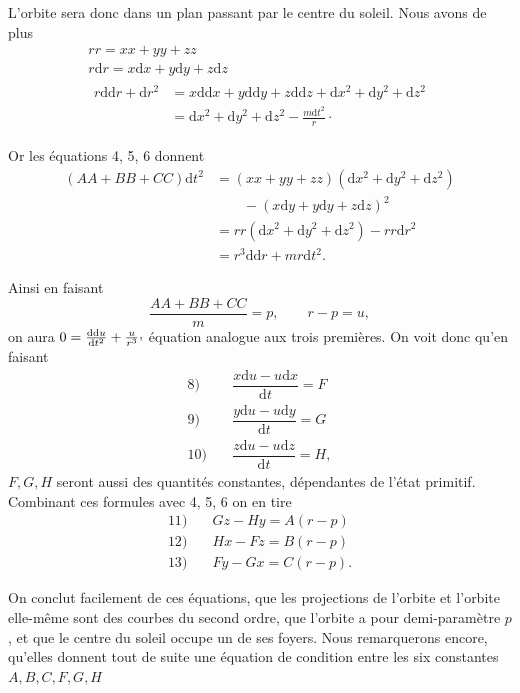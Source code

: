 \par L’orbite sera donc dans un plan passant par le centre du soleil. Nous avons de plus
\[
\begin{gathered}
rr=xx+yy+zz\\
r\mathrm{d}r=x\mathrm{d}x+y\mathrm{d}y+z\mathrm{d}z\\
\begin{aligned}
r\mathrm{dd}r+\mathrm{d}r^2&=x\mathrm{dd}x+y\mathrm{dd}y+z\mathrm{dd}z+\mathrm{d}x^2+\mathrm{d}y^2+\mathrm{d}z^2\\
&=\mathrm{d}x^2+\mathrm{d}y^2+\mathrm{d}z^2-\frac{m\mathrm{d}t^2}{r}\mathpunct{\cdot}
\end{aligned}
\end{gathered}
\]
\par Or les équations 4, 5, 6 donnent
\[
\begin{aligned}
(AA+BB+CC)\mathrm{d}t^2
&=(xx+yy+zz)(\mathrm{d}x^2+\mathrm{d}y^2+\mathrm{d}z^2)\\
&\qquad{}-(x\mathrm{d}y+y\mathrm{d}y+z\mathrm{d}z)^2\\
&=rr(\mathrm{d}x^2+\mathrm{d}y^2+\mathrm{d}z^2)-rr\mathrm{d}r^2\\
&=r^3\mathrm{dd}r+mr\mathrm{d}t^2.
\end{aligned}
\]
\par Ainsi en faisant
\[
\frac{AA+BB+CC}{m}=p,\qquad r-p=u,
\]
on aura \(0=\frac{\mathrm{dd}u}{\mathrm{d}t^2}+\frac{u}{r^3}\mathpunct{\raisebox{.45ex}{,}}\) équation analogue aux trois premières. On voit donc qu’en faisant
\[
\begin{array}{rl}
8)\quad&\dfrac{x\mathrm{d}u-u\mathrm{d}x}{\mathrm{d}t}=F\\[5pt]
9)\quad&\dfrac{y\mathrm{d}u-u\mathrm{d}y}{\mathrm{d}t}=G\\[5pt]
10)\quad&\dfrac{z\mathrm{d}u-u\mathrm{d}z}{\mathrm{d}t}=H,
\end{array}
\]
\(F,G,H\) seront aussi des quantités constantes, dépendantes de l’état primitif. Combinant ces formules avec 4, 5, 6 on en tire
\[
\begin{array}{rl}
11)\quad&Gz-Hy=A(r-p)\\
12)\quad&Hx-Fz=B(r-p)\\
13)\quad&Fy-Gx=C(r-p).
\end{array}
\]
\par On conclut facilement de ces équations, que les projections de l’orbite et l’orbite elle-même sont des courbes du second ordre, que l’orbite a pour demi-paramètre \(p\), et que le centre du soleil occupe un de ses foyers. Nous remarquerons encore, qu’elles donnent tout de suite une équation de condition entre les six constantes \(A,B,C,F,G,H\)
